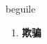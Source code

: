
\begin{frame}
{\huge beguile}
\begin{center}
\begin{enumerate}\Large
  \item \textbf{欺骗}
\end{enumerate}
\end{center}
\end{frame}
